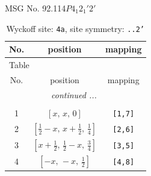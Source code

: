 \documentclass[fleqn,8pt]{jsarticle}
\begin{document}
\setcounter{MaxMatrixCols}{32}

\renewcommand{\tablename}{Table~}
\renewcommand{\figurename}{Figure~}
\begin{center}
\LARGE
MSG No. 92.114\quad$P4_{1}2_{1}'2'$
\end{center}
\renewcommand{\arraystretch}{1.2}
\begin{longtable}{ccc}
\caption{Wyckoff site: {\tt 4a}, site symmetry: {\tt ..2'}}
 \\
 \hline \hline
No. & position & mapping \\ \hline \endfirsthead

\multicolumn{2}{l}{\tablename\ \thetable{}} \\
 \hline \hline
No. & position & mapping \\ \hline \endhead

 \hline \hline
\multicolumn{2}{r}{\footnotesize\it continued ...} \\ \endfoot

 \hline \hline
\multicolumn{2}{r}{} \\ \endlastfoot

1 & $\left[ x,\, x,\, 0 \right]$ & {\tt [1,7]} \\ \hline
2 & $\left[ \frac{1}{2} - x,\, x + \frac{1}{2},\, \frac{1}{4} \right]$ & {\tt [2,6]} \\ \hline
3 & $\left[ x + \frac{1}{2},\, \frac{1}{2} - x,\, \frac{3}{4} \right]$ & {\tt [3,5]} \\ \hline
4 & $\left[ - x,\, - x,\, \frac{1}{2} \right]$ & {\tt [4,8]} \\
\end{longtable}
\renewcommand{\arraystretch}{1.2}
\end{document}
